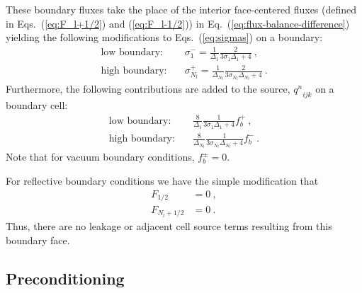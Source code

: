 \documentclass[preprint,12pt]{elsarticle}
\newcommand{\qn}{\ensuremath{q^n}} \newcommand{\Tn}{\ensuremath{T^n}}
\begin{document}
These boundary fluxes take the place of the interior face-centered fluxes
(defined in Eqs.~(\ref{eq:F_l+1/2}) and (\ref{eq:F_l-1/2})) in
Eq.~(\ref{eq:flux-balance-difference}) yielding the following modifications to
Eqs.~(\ref{eq:sigmas}) on a boundary:
\begin{align}
  \text{low boundary:}\quad & \sigma_1^{-} = \frac{1}{\Delta_1}
  \frac{2}{3\sigma_1\Delta_1 + 4}\:,\\ \text{high boundary:}\quad &
  \sigma_{N_l}^{+} = \frac{1}{\Delta_{N_l}}
  \frac{2}{3\sigma_{N_l}\Delta_{N_l} + 4}\:.
\end{align}
Furthermore, the following contributions are added to the source, $\qn_{ijk}$
on a boundary cell:
\begin{align}
  \text{low boundary:}\quad & \frac{8}{\Delta_1}
  \frac{1}{3\sigma_1\Delta_1 + 4}f_b^{+}\:,\\ \text{high
    boundary:}\quad & \frac{8}{\Delta_{N_l}}
  \frac{1}{3\sigma_{N_l}\Delta_{N_l} + 4}f_b^{-}\:.
\end{align}
Note that for vacuum boundary conditions, $f_b^{\pm} = 0$.

For reflective boundary conditions we have the simple modification that
\begin{align}
  F_{1/2} &= 0\:, \\ F_{N_l+1/2} &= 0\:.
\end{align}
Thus, there are no leakage or adjacent cell source terms resulting from this
boundary face.

\subsection{Preconditioning}
\label{sec:preconditioning}
\end{document}
